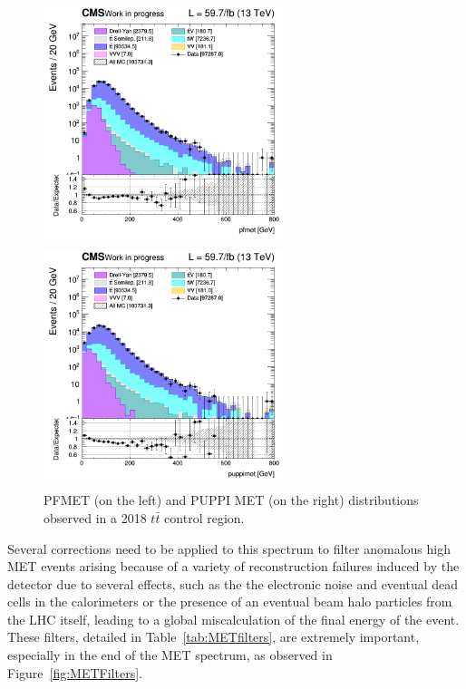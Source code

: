 \documentclass[a4paper, 10pt, openright]{report}
\begin{document}
\begin{figure}[htbp]
\centering
\begin{minipage}[b]{.49\textwidth}
\includegraphics[width=7cm, height=7cm]{figs/log_cratio_ttbarCR_ll_pfmet_extended.png}
\end{minipage}\hfill
\begin{minipage}[b]{.49\textwidth}
\includegraphics[width=7cm, height=7cm]{figs/log_cratio_ttbarCR_ll_puppimet.png}
\end{minipage} \hfill
\caption{PFMET (on the left) and \ac{PUPPI} \ac{MET} (on the right) distributions observed in a 2018 $t \bar t$ control region.}
\label{fig:metStudy}
\end{figure}

Several corrections need to be applied to this spectrum to filter anomalous high \ac{MET} events arising because of a variety of reconstruction failures induced by the detector due to several effects, such as the the electronic noise and eventual dead cells in the calorimeters or the presence of an eventual beam halo particles from the \ac{LHC} itself, leading to a global miscalculation of the final energy of the event. These filters, detailed in Table~\ref{tab:METfilters}, are extremely important, especially in the end of the \ac{MET} spectrum, as observed in Figure~\ref{fig:METFilters}.
\end{document}
